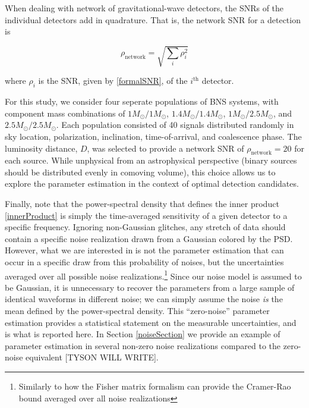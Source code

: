 \documentclass[11pt,a4paper]{emulateapj}
\newcommand{\carl}[1]{{\color{red}  #1}}
\begin{document}
When dealing with network of gravitational-wave detectors, the SNRs of the individual detectors add in quadrature.  That is, the network SNR for a detection is

\begin{equation}
\rho_{\text{network}} = \sqrt{\sum_i \rho_{i}^2}
\label{SNRnetwork}
\end{equation}

\noindent where $\rho_i$ is the SNR, given by \eqref{formalSNR}, of the $i^{\text{th}}$ detector.

For this study, we consider four seperate populations of BNS systems, with component mass 
combinations of $1M_{\odot}/1M_{\odot}$, $1.4M_{\odot}/1.4M_{\odot}$, $1M_{\odot}/2.5M_{\odot}$, 
and $2.5M_{\odot}/2.5M_{\odot}$.  Each population consisted of 40 signals distributed randomly
in sky location, polarization, inclination, time-of-arrival, and coalescence phase.  The luminosity 
distance, $D$, was selected to provide a network SNR of $\rho_{\text{network}}=20$ for each source.
While unphysical from an astrophysical perspective (binary sources should be 
distributed evenly in comoving volume), this choice allows us to explore the parameter estimation
in the context of optimal detection candidates. 

Finally, note that the power-spectral density that defines the inner product \eqref{innerProduct} is simply 
the time-averaged sensitivity of a given detector to a specific frequency.  Ignoring non-Gaussian glitches,
 any stretch of data should contain a specific noise realization drawn from a Gaussian colored by the PSD.
   However, what we are interested in is not the parameter estimation that can occur in a specific draw
    from this probability of noises, but the uncertainties averaged over all possible noise
     realizations.\footnote{Similarly to how the Fisher matrix formalism can provide the Cramer-Rao bound averaged over
     all noise realizations} Since our noise model is assumed to be Gaussian, it is unnecessary to recover the
      parameters from a large sample of identical waveforms in different noise; we can simply assume the 
      noise \emph{is} the mean defined by the power-spectral density.  This ``zero-noise'' parameter estimation
       provides a statistical statement on the measurable uncertainties, and is what is reported here.  In Section
        \ref{noiseSection} we provide an example of parameter estimation in several non-zero noise realizations
compared to the zero-noise equivalent \carl{[TYSON WILL WRITE]}. 
\end{document}
